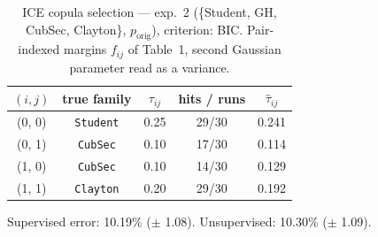 \begin{table}[htbp]
  \centering
  \caption{ICE copula selection — exp.\ 2 (\{Student, GH, CubSec, Clayton\}, $p_{\text{orig}}$), criterion: BIC. Pair-indexed margins $f_{ij}$ of Table~1, second Gaussian parameter read as a variance.}
  \label{tab:exp3-exp2_orig_p__bic}
  \begin{tabular}{ccccc}
    \toprule
    $(i, j)$ & true family & $\tau_{ij}$ & hits / runs & $\hat\tau_{ij}$ \\
    \midrule
    (0, 0) & \texttt{Student} & 0.25 & 29/30 & 0.241 \\
    (0, 1) & \texttt{CubSec} & 0.10 & 17/30 & 0.114 \\
    (1, 0) & \texttt{CubSec} & 0.10 & 14/30 & 0.129 \\
    (1, 1) & \texttt{Clayton} & 0.20 & 29/30 & 0.192 \\
    \bottomrule
  \end{tabular}
  \par\smallskip Supervised error: 10.19\% ($\pm$ 1.08). Unsupervised: 10.30\% ($\pm$ 1.09).
\end{table}
